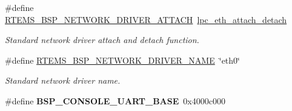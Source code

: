 \begin{DoxyCompactItemize}
\#define \mbox{\hyperlink{group__RTEMSBSPsARMLPC24XX_gadde0d66aef9442971dde465292ac14e6}{R\+T\+E\+M\+S\+\_\+\+B\+S\+P\+\_\+\+N\+E\+T\+W\+O\+R\+K\+\_\+\+D\+R\+I\+V\+E\+R\+\_\+\+A\+T\+T\+A\+CH}}~\mbox{\hyperlink{group__RTEMSBSPsARMLPC24XX_ga1ee87990424a1bed28cb5081a56043b2}{lpc\+\_\+eth\+\_\+attach\+\_\+detach}}
\begin{DoxyCompactList}\small\item\em Standard network driver attach and detach function. \end{DoxyCompactList}\item 
\mbox{\label{group__RTEMSBSPsARMLPC24XX_ga86d4f9aa98431100692e31068070a8df}} 
\#define \mbox{\hyperlink{group__RTEMSBSPsARMLPC24XX_ga86d4f9aa98431100692e31068070a8df}{R\+T\+E\+M\+S\+\_\+\+B\+S\+P\+\_\+\+N\+E\+T\+W\+O\+R\+K\+\_\+\+D\+R\+I\+V\+E\+R\+\_\+\+N\+A\+ME}}~\char`\"{}eth0\char`\"{}
\begin{DoxyCompactList}\small\item\em Standard network driver name. \end{DoxyCompactList}\item 
\mbox{\label{group__RTEMSBSPsARMLPC24XX_ga079b62d123214293876069996b7665a6}} 
\#define {\bfseries B\+S\+P\+\_\+\+C\+O\+N\+S\+O\+L\+E\+\_\+\+U\+A\+R\+T\+\_\+\+B\+A\+SE}~0x4000c000
\end{DoxyCompactItemize}

